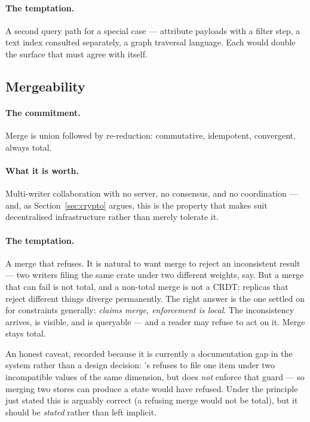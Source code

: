 \paragraph{The temptation.} A second query path for a special case ---
attribute payloads with a filter step, a text index consulted separately, a
graph traversal language. Each would double the surface that must agree with
itself.

\subsection{Mergeability}

\paragraph{The commitment.} Merge is union followed by re-reduction:
commutative, idempotent, convergent, always total.

\paragraph{What it is worth.} Multi-writer collaboration with no server, no
consensus, and no coordination --- and, as Section~\ref{sec:crypto} argues,
this is the property that makes \odag{} suit decentralised infrastructure
rather than merely tolerate it.

\paragraph{The temptation.} A merge that refuses. It is natural to want merge
to reject an inconsistent result --- two writers filing the same crate under
two different weights, say. But a merge that can fail is not total, and a
non-total merge is not a CRDT: replicas that reject different things diverge
permanently. The right answer is the one \odag{} settled on for constraints
generally: \emph{claims merge, enforcement is local}. The inconsistency
arrives, is visible, and is queryable --- and a reader may refuse to act on
it. Merge stays total.

\begin{pitfall}
An honest caveat, recorded because it is currently a documentation gap in the
system rather than a design decision: \odag{}'s  refuses to file one
item under two incompatible values of the same dimension, but 
does \emph{not} enforce that guard --- so merging two stores can produce a
state  would have refused. Under the principle just stated this is
arguably correct (a refusing merge would not be total), but it should be
\emph{stated} rather than left implicit.
\end{pitfall}

